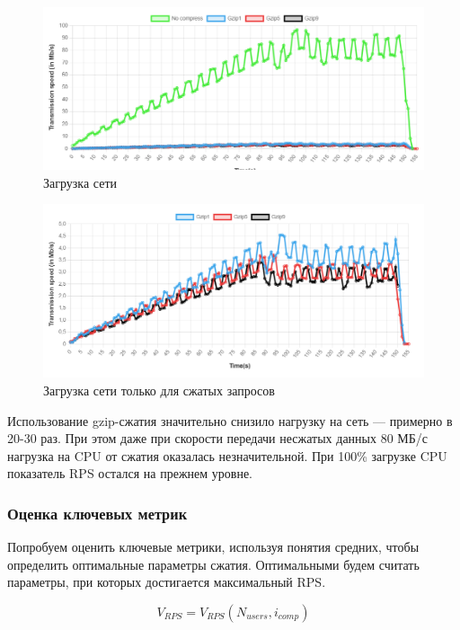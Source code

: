 \documentclass[12pt]{article}
\begin{document}
\begin{figure}[H]
    \centering
    \includegraphics[width=1\textwidth]{../images/second_part/Transmission_speed.png}
    \caption{Загрузка сети}
\end{figure}

\begin{figure}[H]
    \centering
    \includegraphics[width=1\textwidth]{../images/second_part/Transmission_speed_withot_nocompress.png}
    \caption{Загрузка сети только для сжатых запросов}
\end{figure}

Использование gzip-сжатия значительно снизило нагрузку на сеть — примерно в 20-30 раз.
При этом даже при скорости передачи несжатых данных 80 МБ/с нагрузка на CPU от сжатия оказалась незначительной.
При 100\% загрузке CPU показатель RPS остался на прежнем уровне.

\subsubsection{Оценка ключевых метрик}

Попробуем оценить ключевые метрики, используя понятия средних, чтобы определить оптимальные параметры сжатия.
Оптимальными будем считать параметры, при которых достигается максимальный RPS.

\[
    V_{RPS} = V_{RPS}(N_{users}, i_{comp})
\]
\end{document}
